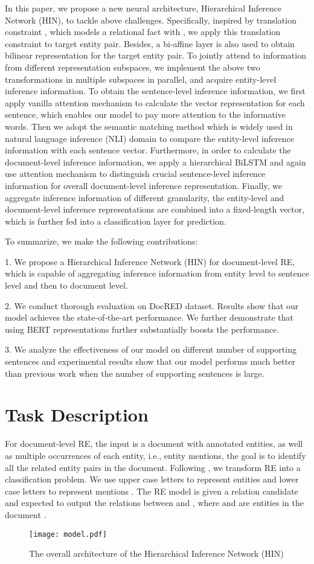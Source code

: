 \documentclass[runningheads]{llncs}
\begin{document}
In this paper, we propose a new neural architecture, Hierarchical Inference Network (HIN), to tackle above challenges.
Specifically, inspired by translation constraint \cite{bordes2013translating}, which models a relational fact  with ,
we apply this translation constraint to target entity pair.
Besides, a bi-affine layer is also used to obtain bilinear representation for the target entity pair.
To jointly attend to information from different representation subspaces, we implement the above two transformations in multiple subspaces in parallel, and acquire entity-level inference information.
To obtain the sentence-level inference information, we first apply vanilla attention mechanism to calculate the vector representation for each sentence, which enables our model to pay more attention to the informative words.
Then we adopt the semantic matching method which is widely used in natural language inference (NLI) domain to compare the entity-level inference information with each sentence vector. 
Furthermore, in order to calculate the document-level inference information, we apply a hierarchical BiLSTM and again use attention mechanism to distinguish crucial sentence-level inference information for overall document-level inference representation.
Finally, we aggregate inference information of different granularity, the entity-level and document-level inference representations are combined into a fixed-length vector, 
which is further fed into a classification layer for prediction.

To summarize, we make the following contributions:

1. We propose a Hierarchical Inference Network (HIN) for document-level RE, which is capable of aggregating inference information from entity level to sentence level and then to document level.

2. We conduct thorough evaluation on DocRED dataset. Results show that our model achieves the state-of-the-art performance. We further demonstrate that using BERT representations further substantially boosts the performance.

3. We analyze the effectiveness of our model on different number of supporting sentences and experimental results show that our model performs much better than previous work when the number of supporting sentences is large.

\section{Task Description }
For document-level RE, the input is a document with annotated entities, as well as multiple occurrences of each entity, i.e., entity mentions,
the goal is to identify all the related entity pairs in the document.
Following \cite{Yao2019DocREDAL}, we transform RE into a classification problem.
We use upper case letters to represent entities  and lower case letters to represent mentions .
The RE model is given a relation candidate  and expected to output the relations between  and , where  and  are entities in the document .
\begin{figure*}[ht]
	\centering
	\texttt{[image: model.pdf]} 
	\protect\caption{The overall architecture of the Hierarchical Inference Network (HIN)}
	\label{Fig. 2}
\end{figure*}
\end{document}
